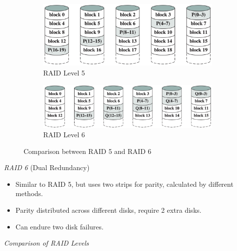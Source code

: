 \begin{figure}[H]
    \centering
    \hfill
    \begin{subfigure}{0.4\textwidth}
        \centering
        \includegraphics[width=\textwidth]{chaps/memory/external-memory/raid-level-5.png}
        \caption{RAID Level 5}
    \end{subfigure}
    \hfill
    \begin{subfigure}{0.5\textwidth}
        \centering
        \includegraphics[width=\textwidth]{chaps/memory/external-memory/raid-level-6.png}
        \caption{RAID Level 6}
    \end{subfigure}
    \hfill
    \caption{Comparison between RAID 5 and RAID 6}
\end{figure}

\emph{RAID 6} {\normalfont\large (Dual Redundancy)}

\begin{itemize}
    \item Similar to RAID 5, but uses two strips for parity, calculated by different methods.
    \item Parity distributed across different disks, require 2 extra disks.
    \item Can endure two disk failures.
\end{itemize}

\emph{Comparison of RAID Levels}

